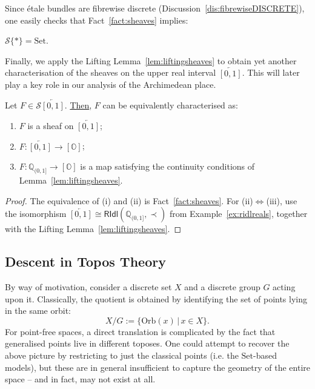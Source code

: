 \documentclass[a4paper, 11pt,reqno]{amsart}
\newcommand{\Set}{\mathrm{Set}}
\newcommand{\baseS}{\mathcal{S}}
\newcommand{\qint}{\mathbb{Q}_{(0,1]}}
\newcommand{\RIdl}{\mathsf{RIdl}}
\begin{document}
Since \'{e}tale bundles are fibrewise discrete (Discussion~\ref{dis:fibrewiseDISCRETE}), one easily checks that Fact~\ref{fact:sheaves} implies: 

\begin{corollary}\label{cor:Set} $\baseS\{\ast\}=\Set$.
\end{corollary}

Finally, we apply the Lifting Lemma~\ref{lem:liftingsheaves} to obtain yet another characterisation of the sheaves on the upper real interval $\overleftarrow{[0,1]}$. This will later play a key role in our analysis of the Archimedean place. 

\begin{observation}\label{obs:CHARof[0,1]SHEAVES} Let $F\in\baseS\overleftarrow{[0,1]}$. 	\underline{Then}, $F$ can be equivalently characterised as:
	\begin{enumerate}[label=(\roman*)]
		\item $F$ is a sheaf on $\overleftarrow{[0,1]}$;
		\item  $F\colon \overleftarrow{[0,1]}\rightarrow[\mathbb{O}]$; %
		\item $F\colon\qint\rightarrow[\mathbb{O}]$ is a map satisfying the continuity conditions of Lemma~\ref{lem:liftingsheaves}. 
	\end{enumerate}
\end{observation}
\begin{proof} The equivalence of (i) and (ii) is Fact~\ref{fact:sheaves}. For (ii)$\iff$(iii), use the isomorphism $\overleftarrow{[0,1]}\cong\RIdl(\qint,\prec)$ from Example~\ref{ex:ridlreals}, together with the Lifting Lemma~\ref{lem:liftingsheaves}.  
\end{proof}

\subsection{Descent in Topos Theory}\label{sec:Des}  By way of motivation, 
consider a discrete set $X$ and a discrete group $G$ acting upon it. Classically, the quotient is obtained by identifying the set of points lying in the same orbit:
\[X/G := \{\mathrm{Orb}(x)\,|\, x\in X\}.\]
For point-free spaces, a direct translation is complicated by the fact that generalised points live in different toposes. One could attempt to recover the above picture by restricting to just the classical points (i.e. the $\Set$-based models), but these are in general insufficient to capture the geometry of the entire space -- and in fact, may not exist at all. 
\end{document}
